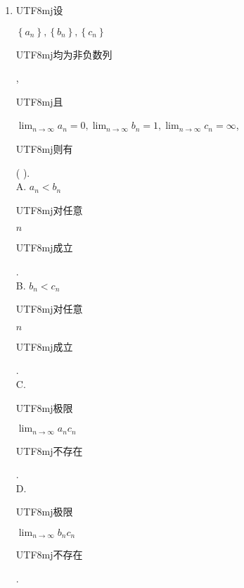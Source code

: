 \documentclass[10pt]{article}
\begin{document}
\begin{enumerate}
  \item \begin{CJK}{UTF8}{mj}设\end{CJK} $\left\{a_{n}\right\},\left\{b_{n}\right\},\left\{c_{n}\right\}$ \begin{CJK}{UTF8}{mj}均为非负数列\end{CJK}, \begin{CJK}{UTF8}{mj}且\end{CJK} $\lim _{n \rightarrow \infty} a_{n}=0, \lim _{n \rightarrow \infty} b_{n}=1, \lim _{n \rightarrow \infty} c_{n}=\infty$, \begin{CJK}{UTF8}{mj}则有\end{CJK} ( ).\\
A. $a_{n}<b_{n}$ \begin{CJK}{UTF8}{mj}对任意\end{CJK} $n$ \begin{CJK}{UTF8}{mj}成立\end{CJK}.\\
B. $b_{n}<c_{n}$ \begin{CJK}{UTF8}{mj}对任意\end{CJK} $n$ \begin{CJK}{UTF8}{mj}成立\end{CJK}.\\
C. \begin{CJK}{UTF8}{mj}极限\end{CJK} $\lim _{n \rightarrow \infty} a_{n} c_{n}$ \begin{CJK}{UTF8}{mj}不存在\end{CJK}.\\
D. \begin{CJK}{UTF8}{mj}极限\end{CJK} $\lim _{n \rightarrow \infty} b_{n} c_{n}$ \begin{CJK}{UTF8}{mj}不存在\end{CJK}.


\end{enumerate}
\end{document}
